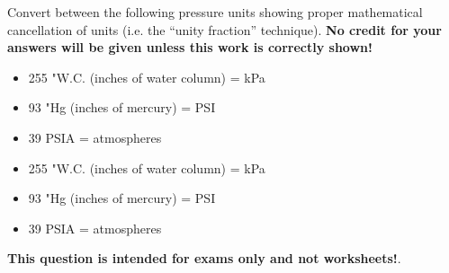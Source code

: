 

Convert between the following pressure units showing proper mathematical cancellation of units (i.e. the ``unity fraction'' technique).  {\bf No credit for your answers will be given unless this work is correctly shown!}

\begin{itemize}
\item{} 255 "W.C. (inches of water column) = \underbar{\hskip 50pt} kPa
\item{} 93 "Hg (inches of mercury) = \underbar{\hskip 50pt} PSI
\item{} 39 PSIA = \underbar{\hskip 50pt} atmospheres
\end{itemize}







\begin{itemize}
\item{} 255 "W.C. (inches of water column) =  kPa
\item{} 93 "Hg (inches of mercury) =  PSI
\item{} 39 PSIA =  atmospheres
\end{itemize}







{\bf This question is intended for exams only and not worksheets!}.



